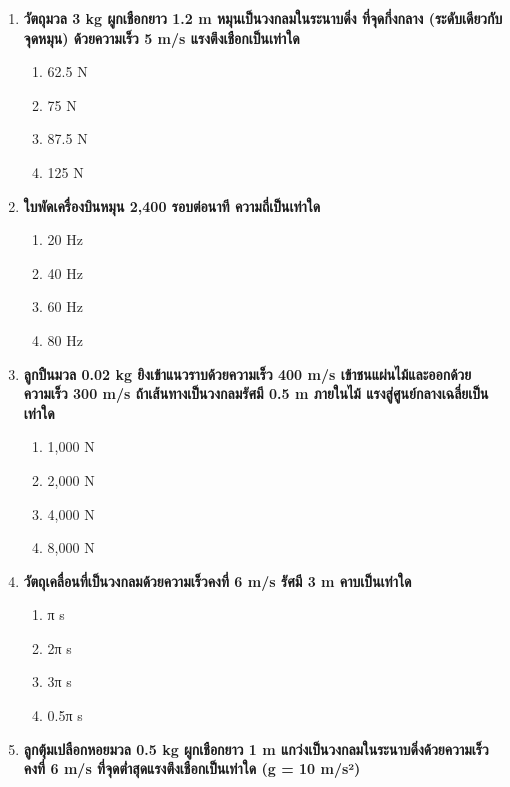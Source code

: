 \documentclass[12pt]{article}
\begin{document}
\begin{enumerate}
\begin{enumerate}[label=\alph*)]
\item 16,000 N
\item 32,000 N
\item 64,000 N
\item 128,000 N
\end{enumerate}
\item \textbf{วัตถุมวล 3 kg ผูกเชือกยาว 1.2 m หมุนเป็นวงกลมในระนาบดิ่ง ที่จุดกึ่งกลาง (ระดับเดียวกับจุดหมุน) ด้วยความเร็ว 5 m/s แรงตึงเชือกเป็นเท่าใด}
\begin{enumerate}[label=\alph*)]
\item 62.5 N
\item 75 N
\item 87.5 N
\item 125 N
\end{enumerate}
\item \textbf{ใบพัดเครื่องบินหมุน 2,400 รอบต่อนาที ความถี่เป็นเท่าใด}
\begin{enumerate}[label=\alph*)]
\item 20 Hz
\item 40 Hz
\item 60 Hz
\item 80 Hz
\end{enumerate}
\item \textbf{ลูกปืนมวล 0.02 kg ยิงเข้าแนวราบด้วยความเร็ว 400 m/s เข้าชนแผ่นไม้และออกด้วยความเร็ว 300 m/s ถ้าเส้นทางเป็นวงกลมรัศมี 0.5 m ภายในไม้ แรงสู่ศูนย์กลางเฉลี่ยเป็นเท่าใด}
\begin{enumerate}[label=\alph*)]
\item 1,000 N
\item 2,000 N
\item 4,000 N
\item 8,000 N
\end{enumerate}
\item \textbf{วัตถุเคลื่อนที่เป็นวงกลมด้วยความเร็วคงที่ 6 m/s รัศมี 3 m คาบเป็นเท่าใด}
\begin{enumerate}[label=\alph*)]
\item π s
\item 2π s
\item 3π s
\item 0.5π s
\end{enumerate}
\item \textbf{ลูกตุ้มเปลือกหอยมวล 0.5 kg ผูกเชือกยาว 1 m แกว่งเป็นวงกลมในระนาบดิ่งด้วยความเร็วคงที่ 6 m/s ที่จุดต่ำสุดแรงตึงเชือกเป็นเท่าใด (g = 10 m/s²)}
\begin{enumerate}[label=\alph*)]

\end{enumerate}
\end{enumerate}
\end{document}
